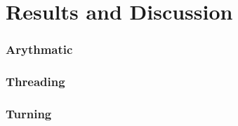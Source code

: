 \chapter{Results and Discussion}
\label{resultanddiscussion}

\subsection{Arythmatic}
\subsection{Threading}
\subsection{Turning}